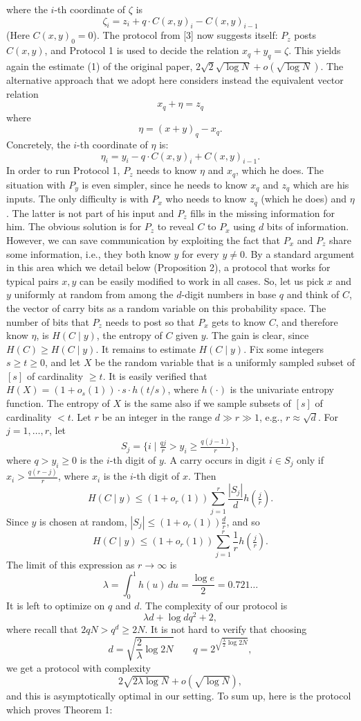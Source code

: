 \documentclass[10pt,a4paper]{article}
\begin{document}
where the $i$-th coordinate of $\zeta$ is
\[\zeta_i=z_i+q\cdot C(x,y)_i-C(x,y)_{i-1}\]
(Here $C(x,y)_0=0$).
The protocol from [3] now suggests itself: $P_z$ posts $C(x,y)$, and Protocol 1 is used to decide the relation $x_q+y_q=\zeta$. This yields again the estimate (1) of the original paper, $2\sqrt2\sqrt{\log N}+o(\sqrt{\log N})$.
The alternative approach that we adopt here considers instead the equivalent vector relation
\[x_q+\eta=z_q\]
where
\[\eta=(x+y)_q-x_q.\]
Concretely, the $i$-th coordinate of $\eta$ is:
\[\eta_i=y_i-q\cdot C(x,y)_i+C(x,y)_{i-1}.\]
In order to run Protocol 1, $P_z$ needs to know $\eta$ and $x_q$, which he does. The situation with $P_y$ is even simpler, since he needs to know $x_q$ and $z_q$ which are his inputs. The only difficulty is with $P_x$ who needs to know $z_q$ (which he does) and $\eta$. The latter is not part of his input and $P_z$ fills in the missing information for him.
The obvious solution is for $P_z$ to reveal $C$ to $P_x$ using $d$ bits of information. However, we can save communication by exploiting the fact that $P_x$ and $P_z$ share some information, i.e., they both know $y$ for every $y\ne0$.
By a standard argument in this area which we detail below (Proposition 2), a protocol that works for typical pairs $x,y$ can be easily modified to work in all cases. So, let us pick $x$ and $y$ uniformly at random from among the $d$-digit numbers in base $q$ and think of $C$, the vector of carry bits as a random variable on this probability space. The number of bits that $P_z$ needs to post so that $P_x$ gets to know $C$, and therefore know $\eta$, is $H(C\mid y)$, the entropy of $C$ given $y$. The gain is clear, since $H(C)\ge H(C\mid y)$.
It remains to estimate $H(C\mid y)$. Fix some integers $s\ge t\ge0$, and let $X$ be the random variable that is a uniformly sampled subset of $[s]$ of cardinality $\ge t$. It is easily verified that $H(X)=(1+o_s(1))\cdot s\cdot h(t/s)$, where $h(\cdot)$ is the univariate entropy function. The entropy of $X$ is the same also if we sample subsets of $[s]$ of cardinality $<t$. Let $r$ be an integer in the range $d\gg r\gg1$, e.g., $r\approx\sqrt d$. For $j=1,\ldots,r$, let
\[S_j=\{i\mid \tfrac{qj}{r}>y_i\ge\tfrac{q(j-1)}{r}\},\]
where $q>y_i\ge0$ is the $i$-th digit of $y$. A carry occurs in digit $i\in S_j$ only if $x_i>\frac{q(r-j)}r$, where $x_i$ is the $i$-th digit of $x$. Then
\[H(C\mid y)\le(1+o_r(1))\sum_{j=1}^r\frac{|S_j|}{d}h(\tfrac jr).\]
Since $y$ is chosen at random, $|S_j|\le(1+o_r(1))\frac dr$, and so
\[H(C\mid y)\le(1+o_r(1))\sum_{j=1}^r\frac1r h(\tfrac jr).\]
The limit of this expression as $r\to\infty$ is
\[\lambda=\int_0^1h(u)\,du=\frac{\log e}{2}=0.721\ldots\]
It is left to optimize on $q$ and $d$. The complexity of our protocol is
\[\lambda d+\log dq^2+2,\]
where recall that $2qN>q^d\ge2N$. It is not hard to verify that choosing
\begin{equation}d=\sqrt{\frac2\lambda\log2N}\qquad q=2^{\sqrt{\frac\lambda2\log2N}},\tag{4}\label{eq:choice}\end{equation}
we get a protocol with complexity
\[2\sqrt{2\lambda\log N}+o(\sqrt{\log N}),\]
and this is asymptotically optimal in our setting.
To sum up, here is the protocol which proves Theorem 1:
\end{document}
